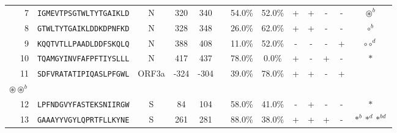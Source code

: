 \begin{tabular}{rcccccccccccc}
7  &  \texttt{IGMEVTPSGTWLTYTGAIKLD} &       N &    320 &   340 &                &                          54.0\% &                           52.0\% &          + &           + &          - &           - &                                                                                                             $ \circledast^b $ \\
8  &  \texttt{GTWLTYTGAIKLDDKDPNFKD} &       N &    328 &   348 &                &                          26.0\% &                           62.0\% &          + &           + &          - &           - &                                                                                                                   $ \circ^b $ \\
9  &  \texttt{KQQTVTLLPAADLDDFSKQLQ} &       N &    388 &   408 &                &                          11.0\% &                           52.0\% &          - &           - &          - &           + &                                                                                                             $ \circ \circ^d $ \\
10 &  \texttt{TQAMGYINVFAFPFTIYSLLL} &       N &    417 &   437 &                &                          78.0\% &                            0.0\% &          + &           - &          + &           - &                                                                                                                      $ \ast $ \\
11 &  \texttt{SDFVRATATIPIQASLPFGWL} &   ORF3a &   -324 &  -304 &                &                          39.0\% &                           78.0\% &          + &           + &          - &           + &                                           \Centerstack{  $\circ \circ^d \circ^b \circ^{bd}$ \\  $\circledast \circledast^b$ } \\
12 &  \texttt{LPFNDGVYFASTEKSNIIRGW} &       S &     84 &   104 &                &                          58.0\% &                           41.0\% &          - &           + &          - &           - &                                                                                                                      $ \ast $ \\
13 &  \texttt{GAAAYYVGYLQPRTFLLKYNE} &       S &    261 &   281 &                &                          88.0\% &                           38.0\% &          + &           + &          + &           - &                                                                                                   $ \ast^b \ast^d \ast^{bd} $ \\

\end{tabular}
